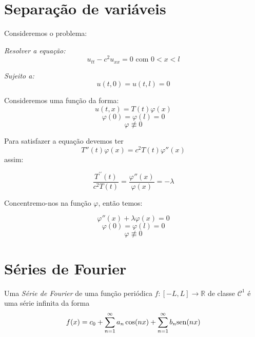 \documentclass[11pt,twoside,a4paper]{book}
\begin{document}
\section{Separação de variáveis}

Consideremos o problema:

\medskip
\noindent
\textit{Resolver a equação:}
\begin{equation*}
    u_{tt}-c^2u_{xx}=0\text{ com $0<x<l$}
\end{equation*}

\noindent
\textit{Sujeito a:}
\begin{equation*}
    u(t,0)=u(t,l)=0
\end{equation*}

\smallskip
\noindent
Consideremos uma função da forma:
\begin{equation*}
    u(t,x)=T(t)\varphi(x)
\end{equation*}
\begin{equation*}
    \varphi(0)=\varphi(l)=0
\end{equation*}
\begin{equation*}
    \varphi\not\equiv 0
\end{equation*}

\noindent
Para satisfazer a equação devemos ter
\begin{equation*}
    T''(t)\varphi(x)=c^2T(t)\varphi''(x)  
\end{equation*}
assim:

\begin{equation*}
    \frac{T^{\prime \prime}(t)}{c^2T(t)}=\frac{\varphi''(x)}{\varphi(x)}=-\lambda
\end{equation*}


\noindent
Concentremo-nos na função $\varphi$, então temos:

\begin{equation*}
    \varphi''(x)+\lambda\varphi(x)=0
\end{equation*}
\begin{equation*}
    \varphi(0)=\varphi(l)=0
\end{equation*}
\begin{equation*}
    \varphi\not\equiv 0
\end{equation*}

\section{Séries de Fourier}

\begin{definicao}


Uma \emph{Série de Fourier} de uma função periódica $f \colon [-L, L] \to \mathbb{R}$ de classe $\mathcal{C}^1$ é uma série infinita da forma
\[f(x) = c_0 + \sum\limits_{n = 1}^\infty a_n \cos(n  x) + \sum\limits_{n = 1}^\infty b_n {\rm sen}(n x)\]

\end{definicao}
\end{document}
